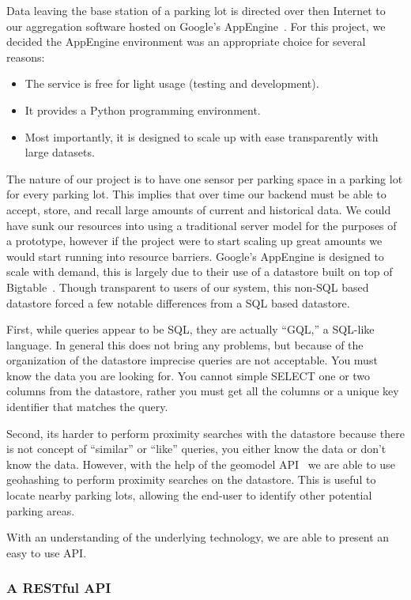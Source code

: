 \documentclass{acm_proc}
\begin{document}
Data leaving the base station of a parking lot is directed over then
Internet to our aggregation software hosted on Google's
AppEngine~\cite{google:appengine}.
For this project, we decided the AppEngine environment was an appropriate
choice for several reasons:
\begin{itemize}
	\item The service is free for light usage (testing and development).
	\item It provides a Python programming environment.
	\item Most importantly, it is designed to scale up with ease
	transparently with large datasets.
\end{itemize}

The nature of our project is to have one sensor per parking space in a
parking lot for every parking lot.
This implies that over time our backend must be able to accept, store, and
recall large amounts of current and historical data.
We could have sunk our resources into using a traditional server model for
the purposes of a prototype, however if the project were to start scaling
up great amounts we would start running into resource barriers.
Google's AppEngine is designed to scale with demand, this is largely due to
their use of a datastore built on top of Bigtable~\cite{google:bigtable}.
Though transparent to users of our system, this non-SQL based datastore
forced a few notable differences from a SQL based datastore.

First, while queries appear to be SQL, they are actually ``GQL,'' a
SQL-like language.
In general this does not bring any problems, but because of the
organization of the datastore imprecise queries are not acceptable.
You must know the data you are looking for.
You cannot simple SELECT one or two columns from the datastore, rather you
must get all the columns or a unique key identifier that matches the query.

Second, its harder to perform proximity searches with the datastore because
there is not concept of ``similar'' or ``like'' queries, you either know
the data or don't know the data.
However, with the help of the geomodel API~\cite{geomodel} we are able to
use geohashing to perform proximity searches on the datastore.
This is useful to locate nearby parking lots, allowing the end-user to
identify other potential parking areas.

With an understanding of the underlying technology, we are able to present
an easy to use API.

\subsubsection{A RESTful API}
\end{document}
